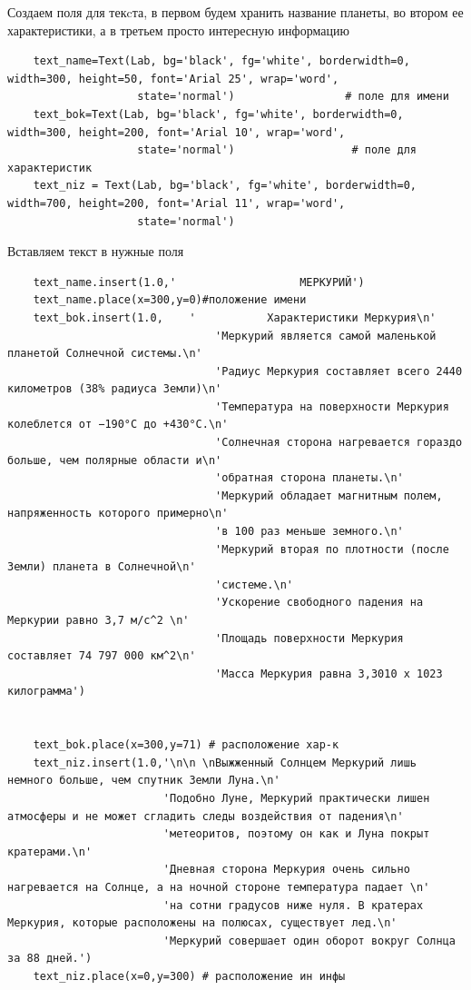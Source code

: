 \documentclass[11pt,a4paper]{report}
\begin{document}
Создаем  поля для текcта, в первом будем хранить название планеты, во втором ее характеристики, а в третьем просто интересную информацию
\begin{verbatim}
    text_name=Text(Lab, bg='black', fg='white', borderwidth=0, width=300, height=50, font='Arial 25', wrap='word',
                    state='normal')                 # поле для имени
    text_bok=Text(Lab, bg='black', fg='white', borderwidth=0, width=300, height=200, font='Arial 10', wrap='word',
                    state='normal')                  # поле для характеристик
    text_niz = Text(Lab, bg='black', fg='white', borderwidth=0, width=700, height=200, font='Arial 11', wrap='word',
                    state='normal')           
\end{verbatim}


Вставляем текст в нужные поля  
\begin{verbatim}
    text_name.insert(1.0,'                   МЕРКУРИЙ')
    text_name.place(x=300,y=0)#положение имени
    text_bok.insert(1.0,    '           Характеристики Меркурия\n' 
                                'Меркурий является самой маленькой планетой Солнечной системы.\n'
                                'Радиус Меркурия составляет всего 2440 километров (38% радиуса Земли)\n'
                                'Температура на поверхности Меркурия колеблется от −190°C до +430°C.\n'
                                'Солнечная сторона нагревается гораздо больше, чем полярные области и\n'
                                'обратная сторона планеты.\n'
                                'Меркурий обладает магнитным полем, напряженность которого примерно\n' 
                                'в 100 раз меньше земного.\n'
                                'Меркурий вторая по плотности (после Земли) планета в Солнечной\n'
                                'системе.\n'
                                'Ускорение свободного падения на Меркурии равно 3,7 м/c^2 \n'
                                'Площадь поверхности Меркурия составляет 74 797 000 км^2\n' 
                                'Масса Меркурия равна 3,3010 х 1023 килограмма')
        
        
    text_bok.place(x=300,y=71) # расположение хар-к        
    text_niz.insert(1.0,'\n\n \nВыжженный Солнцем Меркурий лишь немного больше, чем спутник Земли Луна.\n'
                        'Подобно Луне, Меркурий практически лишен атмосферы и не может сгладить следы воздействия от падения\n' 
                        'метеоритов, поэтому он как и Луна покрыт кратерами.\n'
                        'Дневная сторона Меркурия очень сильно нагревается на Солнце, а на ночной стороне температура падает \n'
                        'на сотни градусов ниже нуля. В кратерах Меркурия, которые расположены на полюсах, существует лед.\n'
                        'Меркурий совершает один оборот вокруг Солнца за 88 дней.')
    text_niz.place(x=0,y=300) # расположение ин инфы  
\end{verbatim}
 
\end{document}
